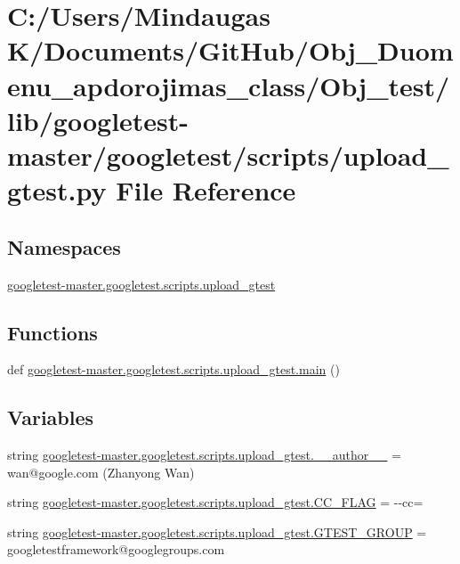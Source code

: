 \hypertarget{_obj__test_2lib_2googletest-master_2googletest_2scripts_2upload__gtest_8py}{}\section{C\+:/\+Users/\+Mindaugas K/\+Documents/\+Git\+Hub/\+Obj\+\_\+\+Duomenu\+\_\+apdorojimas\+\_\+class/\+Obj\+\_\+test/lib/googletest-\/master/googletest/scripts/upload\+\_\+gtest.py File Reference}
\label{_obj__test_2lib_2googletest-master_2googletest_2scripts_2upload__gtest_8py}
\subsection*{Namespaces}
\begin{DoxyCompactItemize}
\item 
 \mbox{\hyperlink{namespacegoogletest-master_1_1googletest_1_1scripts_1_1upload__gtest}{googletest-\/master.\+googletest.\+scripts.\+upload\+\_\+gtest}}
\end{DoxyCompactItemize}
\subsection*{Functions}
\begin{DoxyCompactItemize}
\item 
def \mbox{\hyperlink{namespacegoogletest-master_1_1googletest_1_1scripts_1_1upload__gtest_aece095cb325f9b6c2eb082189fd56c2f}{googletest-\/master.\+googletest.\+scripts.\+upload\+\_\+gtest.\+main}} ()
\end{DoxyCompactItemize}
\subsection*{Variables}
\begin{DoxyCompactItemize}
\item 
string \mbox{\hyperlink{namespacegoogletest-master_1_1googletest_1_1scripts_1_1upload__gtest_a9d28a3b087688524dc86d22fb9dd297f}{googletest-\/master.\+googletest.\+scripts.\+upload\+\_\+gtest.\+\_\+\+\_\+author\+\_\+\+\_\+}} = \textquotesingle{}wan@google.\+com (Zhanyong Wan)\textquotesingle{}
\item 
string \mbox{\hyperlink{namespacegoogletest-master_1_1googletest_1_1scripts_1_1upload__gtest_a3cff3ae0b523d362aba4277f1473f6dd}{googletest-\/master.\+googletest.\+scripts.\+upload\+\_\+gtest.\+C\+C\+\_\+\+F\+L\+AG}} = \textquotesingle{}-\/-\/cc=\textquotesingle{}
\item 
string \mbox{\hyperlink{namespacegoogletest-master_1_1googletest_1_1scripts_1_1upload__gtest_ad6fecd1b08bb0ffd3bb397046091ae7b}{googletest-\/master.\+googletest.\+scripts.\+upload\+\_\+gtest.\+G\+T\+E\+S\+T\+\_\+\+G\+R\+O\+UP}} = \textquotesingle{}googletestframework@googlegroups.\+com\textquotesingle{}
\end{DoxyCompactItemize}
